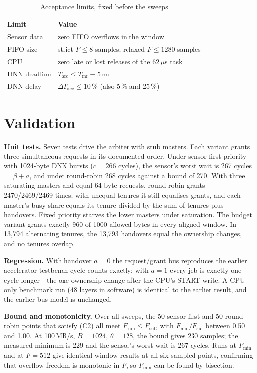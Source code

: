 \documentclass[conference]{IEEEtran}
\newcommand{\Tacc}{T_{\mathrm{acc}}}
\begin{document}
\begin{table}[t]
\caption{Acceptance limits, fixed before the sweeps}
\label{tab:limits}
\centering\footnotesize
\begin{tabular}{@{}ll@{}}
\toprule
Limit & Value \\ \midrule
Sensor data & zero FIFO overflows in the window \\
FIFO size & strict $F\le 8$ samples; relaxed $F\le 1280$ samples \\
CPU & zero late or lost releases of the 62\,$\mu$s task \\
DNN deadline & $\Tacc \le T_{\mathrm{inf}} = 5$\,ms \\
DNN delay & $\Delta\Tacc \le 10\,\%$ (also 5\,\% and 25\,\%) \\ \bottomrule
\end{tabular}
\end{table}

\section{Validation}\label{sec:validation}
\textbf{Unit tests.} Seven tests drive the arbiter with stub masters. Each variant grants three simultaneous requests in its documented order. Under sensor-first priority with 1024-byte DNN bursts ($c=266$ cycles), the sensor's worst wait is 267 cycles $=\beta+a$, and under round-robin 268 cycles against a bound of 270. With three saturating masters and equal 64-byte requests, round-robin grants 2470/2469/2469 times; with unequal tenures it still equalises grants, and each master's busy share equals its tenure divided by the sum of tenures plus handovers. Fixed priority starves the lower masters under saturation. The budget variant grants exactly 960 of 1000 allowed bytes in every aligned window. In 13{,}794 alternating tenures, the 13{,}793 handovers equal the ownership changes, and no tenures overlap.

\textbf{Regression.} With handover $a=0$ the request/grant bus reproduces the earlier accelerator testbench cycle counts exactly; with $a=1$ every job is exactly one cycle longer---the one ownership change after the CPU's START write. A CPU-only benchmark run (48 layers in software) is identical to the earlier result, and the earlier bus model is unchanged.

\textbf{Bound and monotonicity.} Over all sweeps, the 50 sensor-first and 50 round-robin points that satisfy (C2) all meet $F_{\min}\le F_{\mathrm{suf}}$, with $F_{\min}/F_{\mathrm{suf}}$ between 0.50 and 1.00. At 100\,MB/s, $B=1024$, $\theta=128$, the bound gives 230 samples; the measured minimum is 229 and the sensor's worst wait is 267 cycles. Runs at $F_{\min}$ and at $F=512$ give identical window results at all six sampled points, confirming that overflow-freedom is monotonic in $F$, so $F_{\min}$ can be found by bisection.
\end{document}

